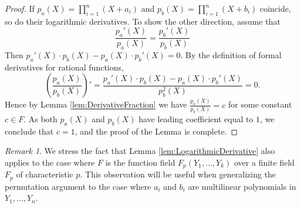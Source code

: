 \documentclass[11pt]{article}
\theoremstyle{definition}
\theoremstyle{remark}
\newtheorem{rem}[thm]{Remark}
\begin{document}
\begin{proof}
If  $p_a(X) = \prod_{i=1}^n \left(X + a_i\right)$ and $p_b(X) = \prod_{i=1}^n \left(X + b_i\right)$
coincide, so do their logarithmic derivatives.
To show the other direction, assume that 
\[
\frac{p_a'(X)}{p_a(X)}  = \frac{p_b'(X)}{p_b(X)}
\]
Then $p_a'(X)\cdot p_b(X) - p_a(X)\cdot  p_b'(X) = 0$. 
By the definition of formal derivatives for rational functions,  
\[
\left(\frac{p_a(X)}{p_b(X)}\right)'  = \frac{p_a'(X)\cdot p_b(X) - p_a(X)\cdot  p_b'(X)} {p_b^2(X)} = 0.
\]
Hence by Lemma \ref{lem:DerivativeFraction} we have $\frac{p_a(X)}{p_b(X)} = c$ for some constant  $c \in F$.
As both $p_a(X)$ and $p_b(X)$ have leading coefficient equal to $1$, we conclude that $c =1$, and the proof of the Lemma is complete.
\end{proof}
\begin{rem}
\label{rem:LogarithmicDerivativeFunctionField}
We stress the fact that Lemma \ref{lem:LogarithmicDerivative} also applies to the case where $F$  is the function field $F_p(Y_1,\ldots, Y_k)$ over a finite field $F_p$ of characteristic $p$.
This observation will be useful when generalizing the permutation argument to the case where $a_i$ and $b_i$ are multilinear polynomials in $Y_1, \ldots, Y_n$.
\end{rem}
\end{document}
